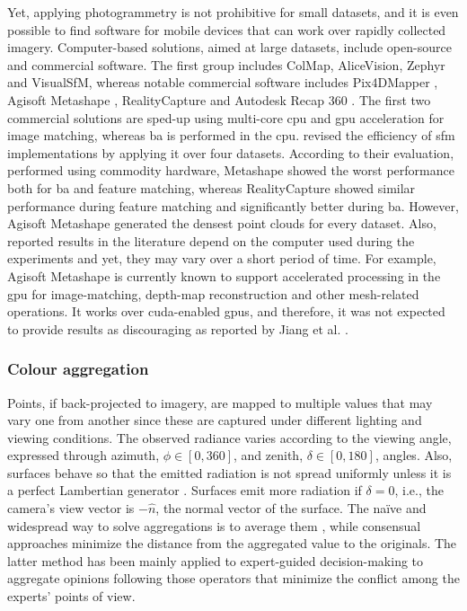 Yet, applying photogrammetry is not prohibitive for small datasets, and it is even possible to find software for mobile devices that can work over rapidly collected imagery. Computer-based solutions, aimed at large datasets, include open-source and commercial software. The first group includes ColMap, AliceVision, Zephyr and VisualSfM, whereas notable commercial software includes Pix4DMapper \cite{zheng_thermal_2020}, Agisoft Metashape \cite{grechi_3d_2021}, RealityCapture and Autodesk Recap 360 \cite{lafi_3d_2017}. The first two commercial solutions are sped-up using multi-core \acrshort{cpu} and \acrshort{gpu} acceleration for image matching, whereas \acrshort{ba} is performed in the \acrshort{cpu}. \cite{jiang_efficient_2020} revised the efficiency of \acrshort{sfm} implementations by applying it over four datasets. According to their evaluation, performed using commodity hardware, Metashape showed the worst performance both for \acrshort{ba} and feature matching, whereas RealityCapture showed similar performance during feature matching and significantly better during \acrshort{ba}. However, Agisoft Metashape generated the densest point clouds for every dataset. Also, reported results in the literature depend on the computer used during the experiments and yet, they may vary over a short period of time. For example, Agisoft Metashape is currently known to support accelerated processing in the \acrshort{gpu} for image-matching, depth-map reconstruction and other mesh-related operations. It works over \acrshort{cuda}-enabled \acrshort{gpu}s, and therefore, it was not expected to provide results as discouraging as reported by Jiang et al. \cite{jiang_efficient_2020}.

\subsubsection{Colour aggregation}

Points, if back-projected to imagery, are mapped to multiple values that may vary one from another since these are captured under different lighting and viewing conditions. The observed radiance varies according to the viewing angle, expressed through azimuth, $\phi \in [0, 360]$, and zenith, $\delta \in [0, 180]$, angles. Also, surfaces behave so that the emitted radiation is not spread uniformly unless it is a perfect Lambertian generator \cite{vollmer_infrared_2017}. Surfaces emit more radiation if $\delta = 0$, i.e., the camera's view vector is $-\hat{n}$, the normal vector of the surface. The naïve and widespread way to solve aggregations is to average them \cite{javadnejad_photogrammetric_2020, hoegner_3d_2016}, while consensual approaches minimize the distance from the aggregated value to the originals. The latter method has been mainly applied to expert-guided decision-making to aggregate opinions following those operators that minimize the conflict among the experts' points of view.

